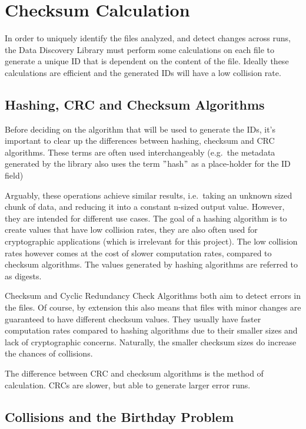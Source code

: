 \section{Checksum Calculation}

In order to uniquely identify the files analyzed, and detect changes across runs, the Data Discovery Library must
perform some calculations on each file to generate a unique ID that is dependent on the content of the file.
Ideally these calculations are efficient and the generated IDs will have a low collision rate.

\subsection{Hashing, CRC and Checksum Algorithms}
Before deciding on the algorithm that will be used to generate the IDs, it's important to clear up the differences
between hashing, checksum and CRC algorithms.
These terms are often used interchangeably (e.g.\ the metadata generated by the library also uses the term \("\)hash\("\)
as a place-holder for the ID field)

Arguably, these operations achieve similar results, i.e.\ taking an unknown sized chunk of data, and reducing it into
a constant n-sized output value.
However, they are intended for different use cases.
The goal of a hashing algorithm is to create values that have low
collision rates, they are also often used for cryptographic applications (which is irrelevant for this project).
The low collision rates however comes at the cost of slower computation rates, compared to checksum algorithms.
The values generated by hashing algorithms are referred to as digests.

\newline

Checksum and Cyclic Redundancy Check Algorithms both aim to detect errors in the files.
Of course, by extension this
also means that files with minor changes are guaranteed to have different checksum values.
They usually have
faster computation rates compared to hashing algorithms due to their smaller sizes and lack of cryptographic concerns.
Naturally, the smaller checksum sizes do increase the chances of collisions.

The difference between CRC and checksum algorithms is the method of calculation.
CRCs are slower, but able to generate larger error runs.

\subsection{Collisions and the Birthday Problem}

